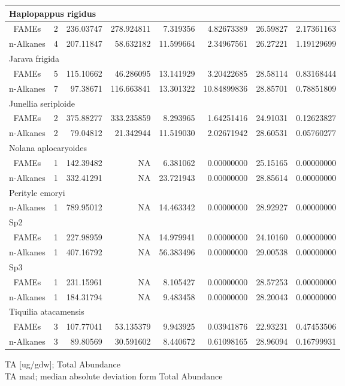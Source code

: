 \documentclass[
  authoryear,
  preprint,
  3p]{elsarticle}
\begin{document}
\begin{longtable}{crrrrrrr}
\midrule
\multicolumn{8}{l}{Haplopappus rigidus} \\ 
\midrule
FAMEs & 2 & 236.03747 & 278.924811 & 7.319356 & 4.82673389 & 26.59827 & 2.17361163 \\ 
n-Alkanes & 4 & 207.11847 & 58.632182 & 11.599664 & 2.34967561 & 26.27221 & 1.19129699 \\ 
\midrule
\multicolumn{8}{l}{Jarava frigida} \\ 
\midrule
FAMEs & 5 & 115.10662 & 46.286095 & 13.141929 & 3.20422685 & 28.58114 & 0.83168444 \\ 
n-Alkanes & 7 & 97.38671 & 116.663841 & 13.301322 & 10.84899836 & 28.85701 & 0.78851809 \\ 
\midrule
\multicolumn{8}{l}{Junellia seriploide} \\ 
\midrule
FAMEs & 2 & 375.88277 & 333.235859 & 8.293965 & 1.64251416 & 24.91031 & 0.12623827 \\ 
n-Alkanes & 2 & 79.04812 & 21.342944 & 11.519030 & 2.02671942 & 28.60531 & 0.05760277 \\ 
\midrule
\multicolumn{8}{l}{Nolana aplocaryoides} \\ 
\midrule
FAMEs & 1 & 142.39482 & NA & 6.381062 & 0.00000000 & 25.15165 & 0.00000000 \\ 
n-Alkanes & 1 & 332.41291 & NA & 23.721943 & 0.00000000 & 28.85614 & 0.00000000 \\ 
\midrule
\multicolumn{8}{l}{Perityle emoryi} \\ 
\midrule
n-Alkanes & 1 & 789.95012 & NA & 14.463342 & 0.00000000 & 28.92927 & 0.00000000 \\ 
\midrule
\multicolumn{8}{l}{Sp2} \\ 
\midrule
FAMEs & 1 & 227.98959 & NA & 14.979941 & 0.00000000 & 24.10160 & 0.00000000 \\ 
n-Alkanes & 1 & 407.16792 & NA & 56.383496 & 0.00000000 & 29.00538 & 0.00000000 \\ 
\midrule
\multicolumn{8}{l}{Sp3} \\ 
\midrule
FAMEs & 1 & 231.15961 & NA & 8.105427 & 0.00000000 & 28.57253 & 0.00000000 \\ 
n-Alkanes & 1 & 184.31794 & NA & 9.483458 & 0.00000000 & 28.20043 & 0.00000000 \\ 
\midrule
\multicolumn{8}{l}{Tiquilia atacamensis} \\ 
\midrule
FAMEs & 3 & 107.77041 & 53.135379 & 9.943925 & 0.03941876 & 22.93231 & 0.47453506 \\ 
n-Alkanes & 3 & 89.80569 & 30.591602 & 8.440672 & 0.61098165 & 28.96094 & 0.16799931 \\ 
\bottomrule
\end{longtable}
\begin{minipage}{\linewidth}
TA [ug/gdw]; Total Abundance\\
TA mad; median absolute deviation form Total Abundance\\
\end{minipage}
\end{document}
